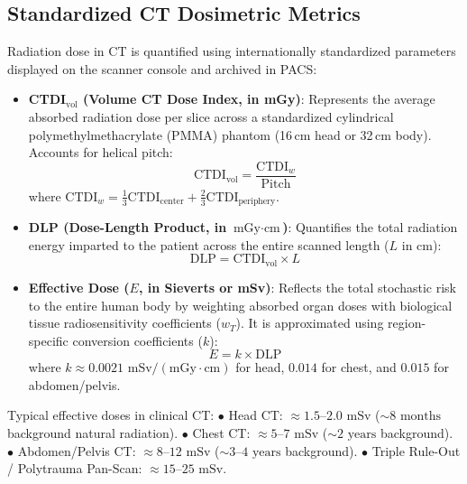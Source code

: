 \documentclass[11pt,a4paper]{article}
\begin{document}
\subsection{Standardized CT Dosimetric Metrics}
Radiation dose in CT is quantified using internationally standardized parameters displayed on the scanner console and archived in PACS:
\begin{itemize}
    \item \textbf{CTDI$_{\text{vol}}$ (Volume CT Dose Index, in mGy)}: Represents the average absorbed radiation dose per slice across a standardized cylindrical polymethylmethacrylate (PMMA) phantom (16\,cm head or 32\,cm body). Accounts for helical pitch:
    \begin{equation}
        \text{CTDI}_{\text{vol}} = \frac{\text{CTDI}_w}{\text{Pitch}}
    \end{equation}
    where $\text{CTDI}_w = \frac{1}{3}\text{CTDI}_{\text{center}} + \frac{2}{3}\text{CTDI}_{\text{periphery}}$.
    \item \textbf{DLP (Dose-Length Product, in $\text{mGy}\cdot\text{cm}$)}: Quantifies the total radiation energy imparted to the patient across the entire scanned length ($L$ in cm):
    \begin{equation}
        \text{DLP} = \text{CTDI}_{\text{vol}} \times L
    \end{equation}
    \item \textbf{Effective Dose ($E$, in Sieverts or mSv)}: Reflects the total stochastic risk to the entire human body by weighting absorbed organ doses with biological tissue radiosensitivity coefficients ($w_T$). It is approximated using region-specific conversion coefficients ($k$):
    \begin{equation}
        E = k \times \text{DLP}
    \end{equation}
    where $k \approx 0.0021\text{ mSv}/(\text{mGy}\cdot\text{cm})$ for head, $0.014$ for chest, and $0.015$ for abdomen/pelvis.
\end{itemize}

\begin{radiationsafety}
Typical effective doses in clinical CT:
$\bullet$ Head CT: $\approx 1.5\text{--}2.0\text{ mSv}$ ($\sim 8\text{ months}$ background natural radiation).
$\bullet$ Chest CT: $\approx 5\text{--}7\text{ mSv}$ ($\sim 2\text{ years}$ background).
$\bullet$ Abdomen/Pelvis CT: $\approx 8\text{--}12\text{ mSv}$ ($\sim 3\text{--}4\text{ years}$ background).
$\bullet$ Triple Rule-Out / Polytrauma Pan-Scan: $\approx 15\text{--}25\text{ mSv}$.
\end{radiationsafety}
\end{document}
